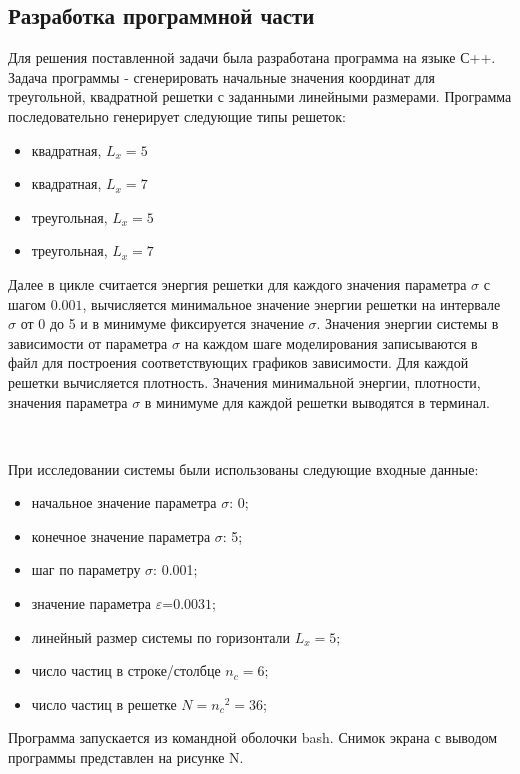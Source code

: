 \documentclass[14pt,a4paper,report]{ncc}
\begin{document}
\subsection{Разработка программной части}
Для решения поставленной задачи была разработана программа на языке С++. Задача программы - сгенерировать начальные значения координат для треугольной, квадратной решетки с заданными линейными размерами.
Программа последовательно генерирует следующие типы решеток:
\begin{itemize}
\item квадратная, {$L_x=5$}
\item квадратная, {$L_x=7$}
\item треугольная, {$L_x=5$}
\item треугольная, {$L_x=7$}
\end{itemize}
Далее в цикле считается энергия решетки для каждого значения параметра $\sigma$ с шагом $0.001$, вычисляется минимальное значение энергии решетки на интервале $\sigma$ от 0 до 5 и в минимуме фиксируется значение $\sigma$. Значения энергии системы в зависимости от параметра $\sigma$ на каждом шаге моделирования записываются в файл для построения соответствующих графиков зависимости. Для каждой решетки вычисляется плотность. 
Значения минимальной энергии, плотности, значения параметра $\sigma$ в минимуме для каждой решетки выводятся в терминал. 

\ 

При исследовании системы были использованы следующие входные данные:
\begin{itemize}
\item начальное значение параметра $\sigma$: 0;
\item конечное значение параметра $\sigma$: 5;
\item шаг по параметру $\sigma$: 0.001;
\item значение параметра $\varepsilon$=$0.0031$;
\item линейный размер системы по горизонтали ${L_x=5}$;
\item число частиц в строке/столбце ${n_c=6}$;
\item число частиц в решетке ${N={n_c}^2=36}$;
\end{itemize}

Программа запускается из командной оболочки bash. Снимок экрана с выводом программы представлен на рисунке N.
\end{document}
